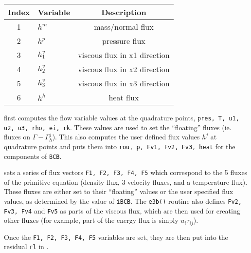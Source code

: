 \documentclass[12pt, letterpaper, twoside]{article}
\newcommand{\ttt}[1]{\texttt{#1}}
\newcommand{\0}{\vec{0}}
\begin{document}
\begin{tabular} { |c|l|c|}
    \hline
    Index & Variable & Description \\
    \hline
    1 & \(h^m\) & mass/normal flux \\
    2 & \(h^p\) & pressure flux \\
    3 & \(h^v_1\) & viscous flux in x1 direction\\
    4 & \(h^v_2\) & viscous flux in x2 direction\\
    5 & \(h^v_3\) & viscous flux in x3 direction\\
    6 & \(h^h\) & heat flux \\
    \hline

\end{tabular}

 first computes the flow variable values at the quadrature points, \ttt{pres, T, u1, u2, u3, rho, ei, rk}. These values are used to set the ``floating'' fluxes (ie. fluxes on \(\Gamma-\Gamma_h^j\)). This also computes the user defined flux values \(h^j\) at quadrature points and puts them into \ttt{rou, p, Fv1, Fv2, Fv3, heat} for the components of \ttt{BCB}. 

 sets a series of flux vectors \ttt{F1, F2, F3, F4, F5} which correspond to the 5 fluxes of the primitive equation (density flux, 3 velocity fluxes, and a temperature flux). These fluxes are either set to their ``floating'' values or the user specified flux values, as determined by the value of \ttt{iBCB}. The \ttt{e3b()} routine also defines \ttt{Fv2, Fv3, Fv4} and \ttt{Fv5} as parts of the viscous flux, which are then used for creating other fluxes (for example, part of the energy flux is simply \(u_i \tau_{ij}\)). 

Once the \ttt{F1, F2, F3, F4, F5} variables are set, they are then put into the residual \ttt{rl} in .
\end{document}
